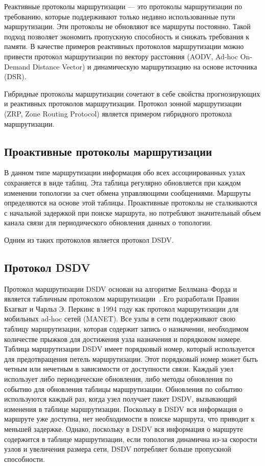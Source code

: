 Реактивные протоколы маршрутизации --- это протоколы маршрутизации по требованию, которые поддерживают только недавно использованные пути маршрутизации. Эти протоколы не обновляют все маршруты постоянно. Такой подход позволяет экономить пропускную способность и снижать требования к памяти. В качестве примеров реактивных протоколов маршрутизации можно привести протокол маршрутизации по вектору расстояния  (AODV, Ad-hoc On-Demand Distance Vector) и динамическую маршрутизацию на основе источника (DSR).

Гибридные протоколы маршрутизации сочетают в себе свойства прогнозирующих и реактивных протоколов маршрутизации. Протокол зонной маршрутизации (ZRP, Zone Routing Protocol) является примером гибридного протокола маршрутизации.

\subsection{Проактивные протоколы маршрутизации}

В данном типе маршрутизации информация обо всех ассоциированных узлах сохраняется в виде таблиц. Эта таблица регулярно обновляется при каждом изменении топологии за счет обмена управляющими сообщениями. Маршруты определяются на основе этой таблицы. Проактивные протоколы не сталкиваются с начальной задержкой при поиске маршрута, но потребляют значительный объем канала связи для периодического обновления данных о топологии.

Одним из таких протоколов является протокол DSDV.

\subsection{Протокол DSDV}

Протокол маршрутизации DSDV основан на алгоритме Беллмана--Форда и является табличным протоколом маршрутизации~\cite{perkins1994highly}. Его разработали Правин Бхагват и Чарльз Э. Перкинс в 1994 году как протокол маршрутизации для мобильных ad-hoc сетей (MANET). Все узлы в сети поддерживают свою таблицу маршрутизации, которая содержит запись о назначении, необходимом количестве прыжков для достижения узла назначения и порядковом номере. Таблица маршрутизации DSDV имеет порядковый номер, который используется для предотвращения петель маршрутизации. Этот порядковый номер может быть четным или нечетным в зависимости от доступности связи. Каждый узел использует либо периодические обновления, либо методы обновления по событию для обновления таблицы маршрутизации. Обновления по событию используются каждый раз, когда узел получает пакет DSDV, вызывающий изменения в таблице маршрутизации. Поскольку в DSDV вся информация о маршруте уже доступна, нет необходимости в поиске маршрута, что приводит к меньшей задержке. Однако, поскольку в DSDV вся информация о маршруте содержится в таблице маршрутизации, если топология динамична из-за скорости узлов и увеличения размера сети, DSDV потребляет больше пропускной способности.

